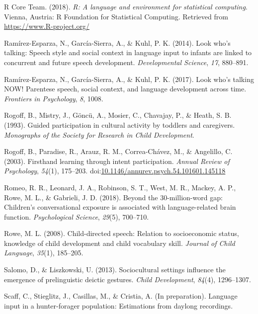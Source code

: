 \documentclass[floatsintext,man]{apa6}
\theoremstyle{definition}
\theoremstyle{definition}
\theoremstyle{definition}
\theoremstyle{remark}
\begin{document}
\hypertarget{ref-R-base}{}
R Core Team. (2018). \emph{R: A language and environment for statistical
computing}. Vienna, Austria: R Foundation for Statistical Computing.
Retrieved from \url{https://www.R-project.org/}

\hypertarget{ref-ramirezesparza2014look}{}
Ramírez-Esparza, N., García-Sierra, A., \& Kuhl, P. K. (2014). Look
who's talking: Speech style and social context in language input to
infants are linked to concurrent and future speech development.
\emph{Developmental Science}, \emph{17}, 880--891.

\hypertarget{ref-ramirezesparza2017look}{}
Ramírez-Esparza, N., García-Sierra, A., \& Kuhl, P. K. (2017). Look
who's talking NOW! Parentese speech, social context, and language
development across time. \emph{Frontiers in Psychology}, \emph{8}, 1008.

\hypertarget{ref-rogoff1993guided}{}
Rogoff, B., Mistry, J., Göncü, A., Mosier, C., Chavajay, P., \& Heath,
S. B. (1993). Guided participation in cultural activity by toddlers and
caregivers. \emph{Monographs of the Society for Research in Child
Development}.

\hypertarget{ref-rogoff2003firsthand}{}
Rogoff, B., Paradise, R., Arauz, R. M., Correa-Chávez, M., \& Angelillo,
C. (2003). Firsthand learning through intent participation. \emph{Annual
Review of Psychology}, \emph{54}(1), 175--203.
doi:\href{https://doi.org/10.1146/annurev.psych.54.101601.145118}{10.1146/annurev.psych.54.101601.145118}

\hypertarget{ref-romeo2018beyond}{}
Romeo, R. R., Leonard, J. A., Robinson, S. T., West, M. R., Mackey, A.
P., Rowe, M. L., \& Gabrieli, J. D. (2018). Beyond the 30-million-word
gap: Children's conversational exposure is associated with
language-related brain function. \emph{Psychological Science},
\emph{29}(5), 700--710.

\hypertarget{ref-rowe2008child}{}
Rowe, M. L. (2008). Child-directed speech: Relation to socioeconomic
status, knowledge of child development and child vocabulary skill.
\emph{Journal of Child Language}, \emph{35}(1), 185--205.

\hypertarget{ref-salomo2013sociocultural}{}
Salomo, D., \& Liszkowski, U. (2013). Sociocultural settings influence
the emergence of prelinguistic deictic gestures. \emph{Child
Development}, \emph{84}(4), 1296--1307.

\hypertarget{ref-scaffIPlanguage}{}
Scaff, C., Stieglitz, J., Casillas, M., \& Cristia, A. (In preparation).
Language input in a hunter-forager population: Estimations from daylong
recordings.
\end{document}
